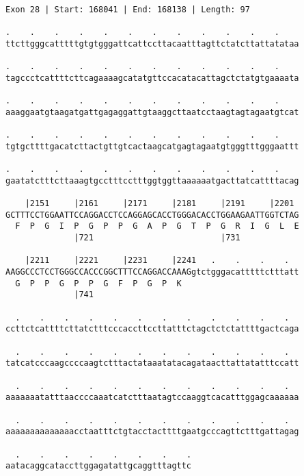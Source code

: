 \documentclass{article}
\begin{document}
\begin{Verbatim}[fontfamily=courier]
Exon 28 | Start: 168041 | End: 168138 | Length: 97

.    .    .    .    .    .    .    .    .    .    .    .    
ttcttgggcatttttgtgtgggattcattccttacaatttagttctatcttattatataa

.    .    .    .    .    .    .    .    .    .    .    .    
tagccctcattttcttcagaaaagcatatgttccacatacattagctctatgtgaaaata

.    .    .    .    .    .    .    .    .    .    .    .    
aaaggaatgtaagatgattgagaggattgtaaggcttaatcctaagtagtagaatgtcat

.    .    .    .    .    .    .    .    .    .    .    .    
tgtgcttttgacatcttactgttgtcactaagcatgagtagaatgtgggtttgggaattt

.    .    .    .    .    .    .    .    .    .    .    .    
gaatatctttcttaaagtgcctttcctttggtggttaaaaaatgacttatcattttacag

    |2151     |2161     |2171     |2181     |2191     |2201 
GCTTTCCTGGAATTCCAGGACCTCCAGGAGCACCTGGGACACCTGGAAGAATTGGTCTAG
  F  P  G  I  P  G  P  P  G  A  P  G  T  P  G  R  I  G  L  E
              |721                          |731            

    |2211     |2221     |2231     |2241   .    .    .    .  
AAGGCCCTCCTGGGCCACCCGGCTTTCCAGGACCAAAGgtctgggacatttttctttatt
  G  P  P  G  P  P  G  F  P  G  P  K                        
              |741                                          

  .    .    .    .    .    .    .    .    .    .    .    .  
ccttctcattttcttatctttcccaccttccttatttctagctctctattttgactcaga

  .    .    .    .    .    .    .    .    .    .    .    .  
tatcatcccaagccccaagtctttactataaatatacagataacttattatatttccatt

  .    .    .    .    .    .    .    .    .    .    .    .  
aaaaaaatatttaaccccaaatcatctttaatagtccaaggtcacatttggagcaaaaaa

  .    .    .    .    .    .    .    .    .    .    .    .  
aaaaaaaaaaaaaacctaatttctgtacctacttttgaatgcccagttctttgattagag

  .    .    .    .    .    .    .    .
aatacaggcataccttggagatattgcaggtttagttc
\end{Verbatim}
\newpage
\end{document}
